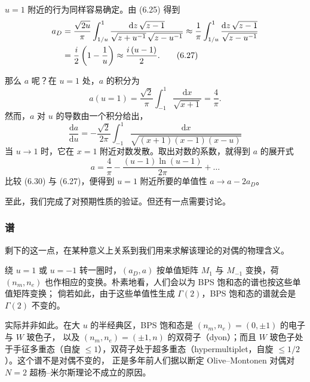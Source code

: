 \documentclass[11pt,a4paper,UTF8,fontset=fandol]{ctexart}
\theoremstyle{plain}
\theoremstyle{definition}
\newcommand{\dd}{\mathrm{d}}
\newcommand{\Nc}{\mathcal{N}}
\def\Nc{N}%
\begin{document}
$u=1$ 附近的行为同样容易确定。由 (6.25) 得到
\begin{align}
  a_D&=\frac{\sqrt{2u}}{\pi}\int_{1/u}^{1}
       \frac{\dd z\,\sqrt{z-1}}{\sqrt{z+u^{-1}}\,\sqrt{z-u^{-1}}}
       \approx\frac{1}{\pi}\int_{1/u}^{1}\frac{\dd z\,\sqrt{z-1}}{\sqrt{z-u^{-1}}}\notag\\
      &=\frac{i}{2}\left(1-\frac{1}{u}\right)\approx\frac{i\,(u-1)}{2}. \tag{6.27}
\end{align}

那么 $a$ 呢？在 $u=1$ 处，$a$ 的积分为
\begin{equation}
  a(u=1)=\frac{\sqrt2}{\pi}\int_{-1}^{1}\frac{\dd x}{\sqrt{x+1}}=\frac{4}{\pi}. \tag{6.28}
\end{equation}
然而，$a$ 对 $u$ 的导数由一个积分给出，
\begin{equation}
  \frac{\dd a}{\dd u}=-\frac{\sqrt2}{2\pi}\int_{-1}^{1}
  \frac{\dd x}{\sqrt{(x+1)(x-1)(x-u)}} \tag{6.29}
\end{equation}
当 $u\to1$ 时，它在 $x=1$ 附近对数发散。取出对数的系数，就得到 $a$ 的展开式
\begin{equation}
  a=\frac{4}{\pi}-\frac{(u-1)\ln(u-1)}{2\pi}+\ldots \tag{6.30}
\end{equation}
比较 (6.30) 与 (6.27)，便得到 $u=1$ 附近所要的单值性 $a\to a-2a_D$。

至此，我们完成了对预期性质的验证。但还有一点需要讨论。

\subsubsection*{谱}

剩下的这一点，在某种意义上关系到我们用来求解该理论的对偶的物理含义。

绕 $u=1$ 或 $u=-1$ 转一圈时，$(a_D,a)$ 按单值矩阵 $M_1$ 与 $M_{-1}$ 变换，荷
$(n_m,n_e)$ 也作相应的变换。朴素地看，人们会以为 BPS 饱和态的谱也按这些单值矩阵变换；
倘若如此，由于这些单值性生成 $\Gamma(2)$，BPS 饱和态的谱就会是 $\Gamma(2)$ 不变的。

实际并非如此。在大 $u$ 的半经典区，BPS 饱和态是 $(n_m,n_e)=(0,\pm1)$ 的电子与 $W$ 玻色子，
以及 $(n_m,n_e)=(\pm1,n)$ 的双荷子（dyon）；而且 $W$ 玻色子处于手征多重态（自旋
$\le 1$），双荷子处于超多重态（hypermultiplet，自旋 $\le 1/2$）。这个谱不是对偶不变的，
正是多年前人们据以断定 Olive--Montonen 对偶对 $\Nc=2$ 超杨--米尔斯理论不成立的原因。
\end{document}
